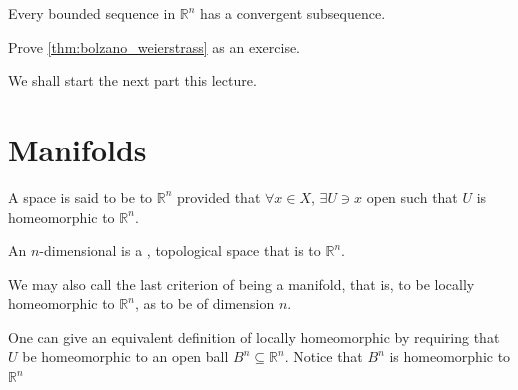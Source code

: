 \documentclass[notoc,notitlepage]{tufte-book}
\begin{document}
\begin{thm}\label{thm:bolzano_weierstrass}
  Every bounded sequence in $\mathbb{R}^n$ has a convergent subsequence.
\end{thm}

\begin{ex}
  Prove \cref{thm:bolzano_weierstrass} as an exercise.
\end{ex}


We shall start the next part this lecture.

\section{Manifolds}%
\label{sec:manifolds}

\begin{defn}\label{defn:locally_homeomorphic}
  A space is said to be  to $\mathbb{R}^n$ provided that
  $\forall x \in X$, $\exists U \ni x$ open such that $U$ is homeomorphic to $\mathbb{R}^n$.
\end{defn}

\begin{defn}[Manifold]\label{defn:manifold}
  An $n$-dimensional  is a ,  topological space that is
   to $\mathbb{R}^n$.
\end{defn}

\begin{note}
  We may also call the last criterion of being a manifold, that is, to be locally
  homeomorphic to $\mathbb{R}^n$, as to be  of dimension
  $n$.
\end{note}

\begin{note}
  One can give an equivalent definition of locally homeomorphic by requiring that
  $U$ be homeomorphic to an open ball $B^n \subseteq \mathbb{R}^n$. Notice that
  $B^n$ is homeomorphic to $\mathbb{R}^n$ 
\end{note}
\end{document}
